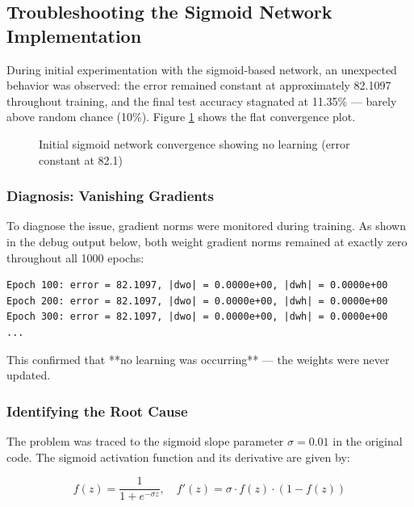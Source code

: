 \subsection{Troubleshooting the Sigmoid Network Implementation}

During initial experimentation with the sigmoid-based network, an unexpected behavior was observed: the error remained constant at approximately 82.1097 throughout training, and the final test accuracy stagnated at 11.35\% — barely above random chance (10\%). Figure \ref{fig:sigmoid_failed} shows the flat convergence plot.

\begin{figure}[h]
\centering
\caption{Initial sigmoid network convergence showing no learning (error constant at 82.1)}
\label{fig:sigmoid_failed}
\end{figure}

\subsubsection{Diagnosis: Vanishing Gradients}

To diagnose the issue, gradient norms were monitored during training. As shown in the debug output below, both weight gradient norms remained at exactly zero throughout all 1000 epochs:

\begin{verbatim}
Epoch 100: error = 82.1097, |dwo| = 0.0000e+00, |dwh| = 0.0000e+00
Epoch 200: error = 82.1097, |dwo| = 0.0000e+00, |dwh| = 0.0000e+00
Epoch 300: error = 82.1097, |dwo| = 0.0000e+00, |dwh| = 0.0000e+00
...
\end{verbatim}

This confirmed that **no learning was occurring** — the weights were never updated.

\subsubsection{Identifying the Root Cause}

The problem was traced to the sigmoid slope parameter \(\sigma = 0.01\) in the original code. The sigmoid activation function and its derivative are given by:

\begin{equation}
f(z) = \frac{1}{1 + e^{-\sigma z}}, \quad f'(z) = \sigma \cdot f(z) \cdot (1 - f(z))
\end{equation}

